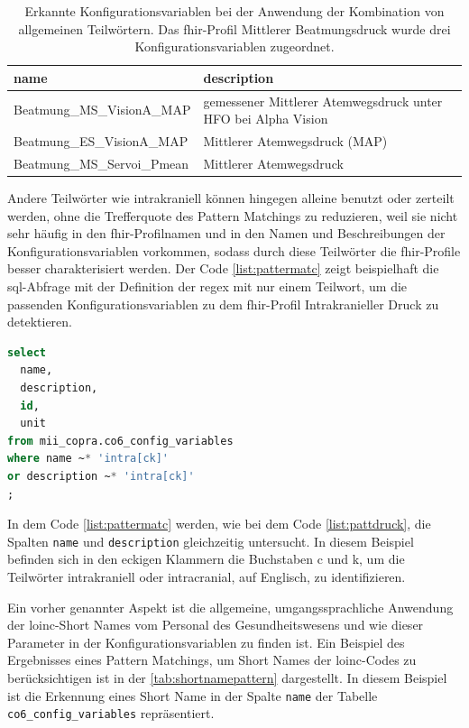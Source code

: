 \begin{longtable}{|l|p{5cm}|}
	\caption[Erkannte Konfigurationsvariablen durch eine \acs{regex} mit einer Kombination von allgemeinen Teilwörtern]{Erkannte Konfigurationsvariablen bei der Anwendung der Kombination von allgemeinen Teilwörtern. Das \ac{fhir}-Profil Mittlerer Beatmungsdruck wurde drei Konfigurationsvariablen zugeordnet.}
	\label{tab:mittatmdruck}
	\endfirsthead
		\hline
		 \bfseries name & \bfseries description \\ \hline
		  Beatmung\_MS\_VisionA\_MAP & gemessener Mittlerer Atemwegsdruck unter HFO bei Alpha Vision \\ \hline
		  Beatmung\_ES\_VisionA\_MAP & Mittlerer Atemwegsdruck (MAP) \\ \hline                             
		  Beatmung\_MS\_Servoi\_Pmean & Mittlerer Atemwegsdruck \\ \hline   
\end{longtable}

Andere Teilwörter wie \glqq intrakraniell\grqq{} können hingegen alleine benutzt oder zerteilt werden, ohne die Trefferquote des Pattern Matchings zu reduzieren, weil sie nicht sehr häufig in den \ac{fhir}-Profilnamen und in den Namen und Beschreibungen der Konfigurationsvariablen vorkommen, sodass durch diese Teilwörter die \ac{fhir}-Profile besser charakterisiert werden. Der Code \ref{list:pattermatc} zeigt beispielhaft die \ac{sql}-Abfrage mit der Definition der \ac{regex} mit nur einem Teilwort, um die passenden Konfigurationsvariablen zu dem \ac{fhir}-Profil \glqq Intrakranieller Druck\grqq{} zu detektieren.

\begin{lstlisting}[language=SQL, caption={[SQL-Abfrage mit einem seltenen Teilwort] SQL-Abfrage mit einem seltenen Teilwort.}, captionpos=b, label=list:pattermatc]
select 
  name, 
  description, 
  id, 
  unit
from mii_copra.co6_config_variables 
where name ~* 'intra[ck]'
or description ~* 'intra[ck]'
;
\end{lstlisting}

In dem Code \ref{list:pattermatc} werden, wie bei dem Code \ref{list:pattdruck}, die Spalten \texttt{name} und \texttt{description} gleichzeitig untersucht. In diesem Beispiel befinden sich in den eckigen Klammern die Buchstaben \glqq c\grqq{} und \glqq k\grqq{}, um die Teilwörter \glqq intrakraniell\grqq{} oder \glqq intracranial\grqq{}, auf Englisch, zu identifizieren.

Ein vorher genannter Aspekt ist die allgemeine, umgangssprachliche Anwendung der \ac{loinc}-\glqq Short Names\grqq{} vom Personal des Gesundheitswesens und wie dieser Parameter in der Konfigurationsvariablen zu finden ist. Ein Beispiel des Ergebnisses eines Pattern Matchings, um \glqq Short Names\grqq{} der \ac{loinc}-Codes zu berücksichtigen ist in der \ref{tab:shortnamepattern} dargestellt. In diesem Beispiel ist die Erkennung eines \glqq Short Name\grqq{} in der Spalte \texttt{name} der Tabelle \texttt{co6\_config\_variables} repräsentiert.

